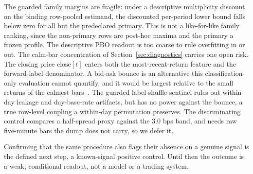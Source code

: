 The guarded family margins are fragile: under a descriptive multiplicity
discount on the binding row-pooled estimand, the discounted per-period lower
bound falls below zero for all but the predeclared primary. This is not a
like-for-like family ranking, since the non-primary rows are post-hoc maxima and
the primary a frozen profile. The descriptive PBO
readout is too coarse to rule overfitting in or out. The calm-bar concentration
of Section~\ref{sec:diagnostics} carries one open risk. The closing price
$\text{close}[t]$ enters both the most-recent-return feature and the forward-label
denominator. A bid-ask bounce is an alternative this classification-only
evaluation cannot quantify, and it would be largest relative to the small returns
of the calmest bars~\cite{roll1984simple,lo1990nonsynchronous}. The guarded
label-shuffle sentinel
rules out within-day leakage and day-base-rate artifacts, but has no power against
the bounce, a true row-level coupling a within-day permutation preserves. The
discriminating control compares a half-spread proxy against the $3.0$ bps band,
and needs raw five-minute bars the dump does not carry, so we defer it.

Confirming that the same procedure also flags their absence on a genuine signal
is the defined next step, a known-signal positive control. Until then the outcome
is a weak, conditional readout, not a model or a trading system.
